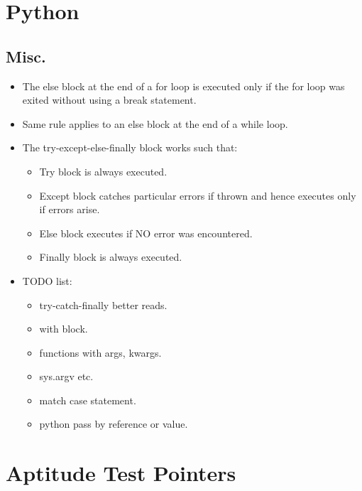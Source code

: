 \documentclass{report}
\begin{document}
\chapter{Python}
\section{Misc.}
\begin{itemize}
\item The else block at the end of a for loop is executed only if the for loop was exited without using a break statement.
\item Same rule applies to an else block at the end of a while loop.
\item The try-except-else-finally block works such that:
\begin{itemize}
\item Try block is always executed.
\item Except block catches particular errors if thrown and hence executes only if errors arise.
\item Else block executes if NO error was encountered.
\item Finally block is always executed.
\end{itemize}
\item TODO list:
\begin{itemize}
\item try-catch-finally better reads.
\item with block.
\item functions with args, kwargs.
\item sys.argv etc.
\item match case statement.
\item python pass by reference or value.
\end{itemize}
\end{itemize}

\chapter{Aptitude Test Pointers}

\end{document}
